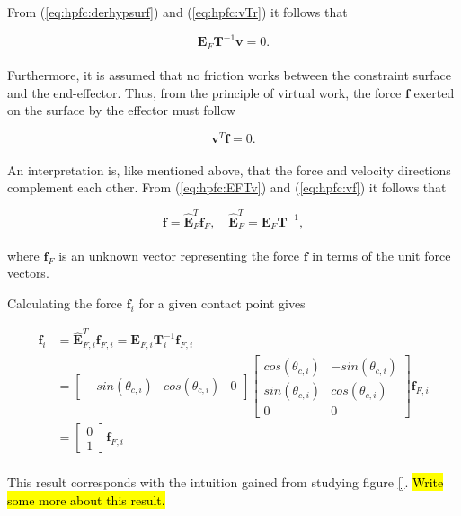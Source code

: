 From (\ref{eq:hpfc:derhypsurf}) and (\ref{eq:hpfc:vTr}) it follows that

\begin{equation}\label{eq:hpfc:EFTv}
    \mathbf{E}_F \mathbf{T}^{-1} \mathbf{v} = 0.
\end{equation}
\\
Furthermore, it is assumed that no friction works between the constraint surface and the end-effector. Thus, from the principle of virtual work, the force $\mathbf{f}$ exerted on the surface by the effector must follow

\begin{equation}\label{eq:hpfc:vf}
    \mathbf{v}^T \mathbf{f} = 0.
\end{equation}
\\
An interpretation is, like mentioned above, that the force and velocity directions complement each other. From (\ref{eq:hpfc:EFTv}) and (\ref{eq:hpfc:vf}) it follows that

\begin{equation}
    \mathbf{f} = \hat{\mathbf{E}}_F^T \mathbf{f}_F, \quad \hat{\mathbf{E}}_F^T = \mathbf{E}_F \mathbf{T}^{-1},
\end{equation}
\\
where $\mathbf{f}_F$ is an unknown vector representing the force $\mathbf{f}$ in terms of the unit force vectors.

Calculating the force $\mathbf{f}_i$ for a given contact point gives

\begin{equation}
    \begin{split}
        \mathbf{f}_i &= \hat{\mathbf{E}}_{F,i}^T \mathbf{f}_{F,i} = \mathbf{E}_{F,i} \mathbf{T}_i^{-1} \mathbf{f}_{F,i}\\
        &=
        \begin{bmatrix}
            -sin(\theta_{c,i}) & cos(\theta_{c,i}) & 0
        \end{bmatrix}
        \begin{bmatrix}
            cos(\theta_{c,i}) & -sin(\theta_{c,i}) \\
            sin(\theta_{c,i}) & cos(\theta_{c,i}) \\
            0 & 0
        \end{bmatrix}
        \mathbf{f}_{F,i}\\
        &=
        \begin{bmatrix}
            0 \\ 1
        \end{bmatrix}
        \mathbf{f}_{F,i}
    \end{split}
\end{equation}
\\
This result corresponds with the intuition gained from studying figure \ref{}. \hl{Write some more about this result.}
